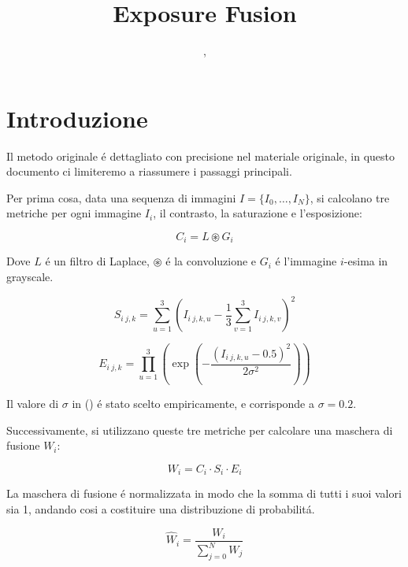 \documentclass[10pt,journal,cspaper,compsoc]{IEEEtran}
\title{Exposure Fusion}
\author{
    \IEEEauthorblockN{Dario Loi}
    \IEEEauthorblockA{(1940849)},
    \IEEEauthorblockN{Flavio Gezzi}
    \IEEEauthorblockA{(1958690)}
}
\begin{document}
\maketitle



\section{Introduzione}

Il metodo originale é dettagliato con precisione nel materiale originale\cite{stanford:exposure_fusion},
in questo documento ci limiteremo a riassumere i passaggi principali. 

Per prima cosa, data una sequenza di immagini $ I = \{ I_0, \dots, I_N \} $, si calcolano
tre metriche per ogni immagine $ I_i $, il contrasto, la saturazione e l'esposizione:

\begin{equation}
    \label{eq:contrast}
    C_i = L \circledast G_i
\end{equation}

Dove $ L $ é un filtro di Laplace, $ \circledast $ é la convoluzione e $ G_i $ é l'immagine $ i $-esima in
grayscale.

\begin{equation}
    \label{eq:saturation}
    S_{i\ j,k} = \sum_{u=1}^3 \left( I_{i\ j,k,u} - \frac{1}{3} \sum_{v=1}^3 I_{i\ j,k,v} \right)^2
\end{equation}

\begin{equation}
    \label{eq:exposure}
    E_{i\ j,k} = \prod_{u=1}^3 \left( \exp(-\frac{(I_{i\ j,k,u} - 0.5)^2}{2 \sigma^2}) \right)
\end{equation}

Il valore di $ \sigma $ in () é stato scelto empiricamente, e 
corrisponde a $\sigma = 0.2$.

Successivamente, si utilizzano queste tre metriche per calcolare una maschera di fusione $W_i$:

\begin{equation}
    \label{eq:fusion_mask}
    W_i = C_i \cdot S_i \cdot E_i
\end{equation}

La maschera di fusione é normalizzata in modo che la somma di tutti i suoi valori sia 1, andando 
cosi a costituire una distribuzione di probabilitá.

\begin{equation}
    \label{eq:fusion_mask_normalization}
    \hat{W}_i = \frac{W_i}{\sum_{j=0}^N W_j}
\end{equation}
\end{document}
